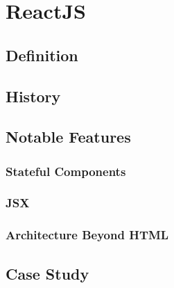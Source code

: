 
\chapter{ReactJS} %

\label{Chapter3} %


\section{Definition}

\section{History}


\section{Notable Features}


\subsection{Stateful Components}


\subsection{JSX}


\subsection{Architecture Beyond HTML}

\section{Case Study}

